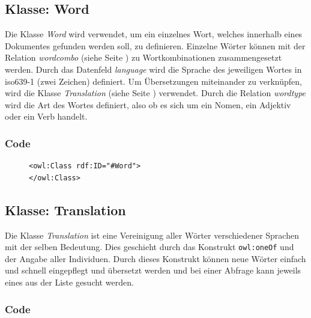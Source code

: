 \documentclass[
    11pt,
    latin1,
    a4paper,
    oneside
]{scrreprt}
\begin{document}
\subsection{Klasse: Word} \label{sec:class_word}

Die Klasse \emph{Word} wird verwendet, um ein einzelnes Wort, welches innerhalb eines Dokumentes gefunden werden soll, zu definieren. Einzelne W\"orter k\"onnen mit der Relation \emph{wordcombo} (siehe  Seite \pageref{sec:rel_wordcombo}) zu Wortkombinationen zusammengesetzt werden. Durch das Datenfeld \emph{language} wird die Sprache des jeweiligen Wortes in iso639-1 (zwei Zeichen) definiert. Um \"Ubersetzungen miteinander zu verkn\"upfen, wird die Klasse \emph{Translation} (siehe  Seite \pageref{sec:class_translation}) verwendet. Durch die Relation \emph{wordtype} wird die Art des Wortes definiert, also ob es sich um ein Nomen, ein Adjektiv oder ein Verb handelt.

\subsubsection{Code}  \label{sec:class_word_code}

\begin{figure}[H]
 \lstset{language=XML}
 \begin{lstlisting}[label=owl:word,caption={Die Klasse \emph{Word} beschreibt ein einzelnes Wort}]
<owl:Class rdf:ID="#Word">
</owl:Class>
 \end{lstlisting}
\end{figure}

\subsection{Klasse: Translation} \label{sec:class_translation}

Die Klasse \emph{Translation} ist eine Vereinigung aller W\"orter verschiedener Sprachen mit der selben Bedeutung. Dies geschieht durch das Konstrukt \texttt{owl:oneOf} und der Angabe aller Individuen. Durch dieses Konstrukt k\"onnen neue W\"orter einfach und schnell eingepflegt und \"ubersetzt werden und bei einer Abfrage kann jeweils eines aus der Liste gesucht werden.

\subsubsection{Code}  \label{sec:class_translation_code}
\end{document}
